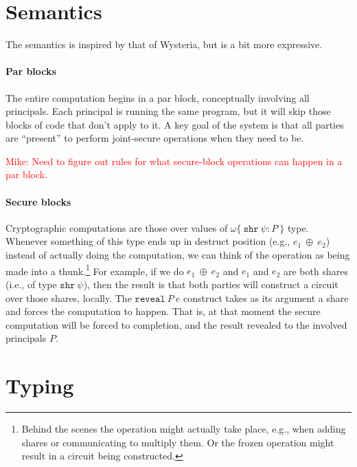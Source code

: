 \documentclass[10pt]{article}
\newcommand{\kw}[1]{\ensuremath{\mathtt{#1}}}
\newcommand{\sshare}[1]{\ensuremath{\mathtt{shr}~{#1}}}
\newcommand{\sectyp}[3]{\ensuremath{{#1} \{~{#2}:{#3}~\}}}
\newcommand{\ebinop}[2]{\ensuremath{{#1}~\oplus~{#2}}}
\newcommand{\ereveal}[2]{\ensuremath{\kw{reveal}~{#1}~{#2}}}
\newcommand{\mwh}[1]{\textcolor{red}{Mike: #1}}
\begin{document}
\section{Semantics}

The semantics is inspired by that of Wysteria, but is a bit more
expressive. 

\paragraph*{Par blocks}

The entire computation begins in a par block, conceptually involving
all principals. Each principal is running the same program, but it
will skip those blocks of code that don't apply to it.  A key goal of
the system is that all parties are ``present'' to perform joint-secure
operations when they need to be.

\mwh{Need to figure out rules for what secure-block operations can happen
in a par block.}

\paragraph*{Secure blocks}

Cryptographic computations are those over values of
$\sectyp{\omega}{\sshare{\psi}}{P}$ type. Whenever something of this
type ends up in destruct position (e.g., $\ebinop{e_1}{e_2}$) instead
of actually doing the computation, we can think of the operation as
being made into a thunk.\footnote{Behind the scenes the operation might
actually take place, e.g., when adding shares or communicating to
multiply them. Or the frozen operation might result in a circuit being
constructed.} For example, if we do $\ebinop{e_1}{e_2}$ and $e_1$ and
$e_2$ are both shares (i.e., of type $\sshare{\psi}$), then the result
is that both parties will construct a circuit over those shares,
locally. The $\ereveal{P}{e}$ construct takes as its argument a share and
forces the computation to happen. That is, at that moment the secure
computation will be forced to completion, and the result revealed to
the involved principals $P$.

\section{Typing}
\end{document}
